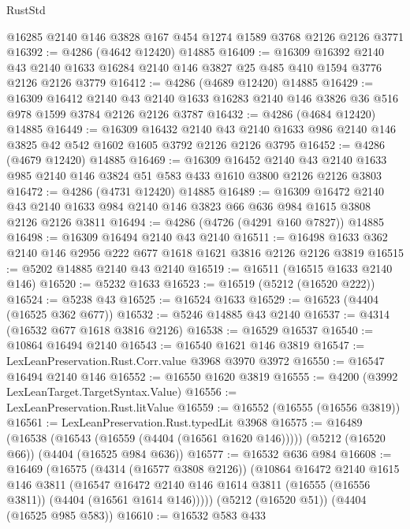 \begin{lexlean}{RustStd}
\begin{coremodule}
{\begin{coremodule}
{{{{{{{{{{{{{{{{    @16285
    @2140
    @146
    @3828
    @167
    @454
    @1274
    @1589
    @3768
    @2126
    @2126
    @3771
@16392 := @4286 (@4642 @12420) @14885
@16409 := @16309
    @16392
    @2140
    @43
    @2140
    @1633
    @16284
    @2140
    @146
    @3827
    @25
    @485
    @410
    @1594
    @3776
    @2126
    @2126
    @3779
@16412 := @4286 (@4689 @12420) @14885
@16429 := @16309
    @16412
    @2140
    @43
    @2140
    @1633
    @16283
    @2140
    @146
    @3826
    @36
    @516
    @978
    @1599
    @3784
    @2126
    @2126
    @3787
@16432 := @4286 (@4684 @12420) @14885
@16449 := @16309
    @16432
    @2140
    @43
    @2140
    @1633
    @986
    @2140
    @146
    @3825
    @42
    @542
    @1602
    @1605
    @3792
    @2126
    @2126
    @3795
@16452 := @4286 (@4679 @12420) @14885
@16469 := @16309
    @16452
    @2140
    @43
    @2140
    @1633
    @985
    @2140
    @146
    @3824
    @51
    @583
    @433
    @1610
    @3800
    @2126
    @2126
    @3803
@16472 := @4286 (@4731 @12420) @14885
@16489 := @16309
    @16472
    @2140
    @43
    @2140
    @1633
    @984
    @2140
    @146
    @3823
    @66
    @636
    @984
    @1615
    @3808
    @2126
    @2126
    @3811
@16494 := @4286 (@4726 (@4291 @160 @7827)) @14885
@16498 := @16309 @16494 @2140 @43 @2140
@16511 := @16498 @1633 @362 @2140 @146 @2956 @222 @677 @1618 @1621 @3816 @2126 @2126 @3819
@16515 := @5202 @14885 @2140 @43 @2140
@16519 := @16511 (@16515 @1633 @2140 @146)
@16520 := @5232 @1633
@16523 := @16519 (@5212 (@16520 @222))
@16524 := @5238 @43
@16525 := @16524 @1633
@16529 := @16523 (@4404 (@16525 @362 @677))
@16532 := @5246 @14885 @43 @2140
@16537 := @4314 (@16532 @677 @1618 @3816 @2126)
@16538 := @16529 @16537
@16540 := @10864 @16494 @2140
@16543 := @16540 @1621 @146 @3819
@16547 := LexLeanPreservation.Rust.Corr.value @3968 @3970 @3972
@16550 := @16547 @16494 @2140 @146
@16552 := @16550 @1620 @3819
@16555 := @4200 (@3992 LexLeanTarget.TargetSyntax.Value)
@16556 := LexLeanPreservation.Rust.litValue
@16559 := @16552 (@16555 (@16556 @3819))
@16561 := LexLeanPreservation.Rust.typedLit @3968
@16575 := @16489
    (@16538 (@16543 (@16559 (@4404 (@16561 @1620 @146)))))
    (@5212 (@16520 @66))
    (@4404 (@16525 @984 @636))
@16577 := @16532 @636 @984
@16608 := @16469
    (@16575
      (@4314 (@16577 @3808 @2126))
      (@10864
        @16472
        @2140
        @1615
        @146
        @3811
        (@16547 @16472 @2140 @146 @1614 @3811 (@16555 (@16556 @3811)) (@4404 (@16561 @1614 @146)))))
    (@5212 (@16520 @51))
    (@4404 (@16525 @985 @583))
@16610 := @16532 @583 @433
}}}}}}}}}}}}}}}}
\end{coremodule}}
\end{coremodule}
\end{lexlean}
